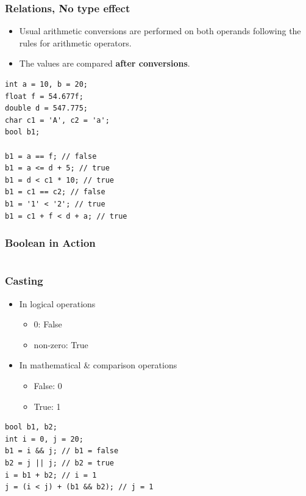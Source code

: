 \documentclass{../c-lecture}
\begin{document}
\begin{frame}[fragile]
  \frametitle{Relations, No type effect}
  \begin{itemize}
    \item Usual arithmetic conversions are performed on both operands following the
      rules for arithmetic operators.
    \item The values are compared \textbf{\color{Orange} after conversions}.
  \end{itemize}
  \begin{verbatim}
int a = 10, b = 20;
float f = 54.677f;
double d = 547.775;
char c1 = 'A', c2 = 'a';
bool b1;

b1 = a == f; // false
b1 = a <= d + 5; // true
b1 = d < c1 * 10; // true
b1 = c1 == c2; // false
b1 = '1' < '2'; // true
b1 = c1 + f < d + a; // true
  \end{verbatim}
\end{frame}

\begin{frame}
  \frametitle{Boolean in Action}
  \inputminted[bgcolor=Black]{c}{./src/boolean.c}
\end{frame}

\begin{frame}[fragile]
  \frametitle{Casting}
  \begin{itemize}
    \item In logical operations
    \begin{itemize}
      \item 0: False
      \item non-zero: True
    \end{itemize}
    \item In mathematical \& comparison operations
    \begin{itemize}
      \item False: 0
      \item True: 1
    \end{itemize}
  \end{itemize}
  \begin{verbatim}
bool b1, b2;
int i = 0, j = 20;
b1 = i && j; // b1 = false
b2 = j || j; // b2 = true
i = b1 + b2; // i = 1
j = (i < j) + (b1 && b2); // j = 1
  \end{verbatim}
\end{frame}
\end{document}
